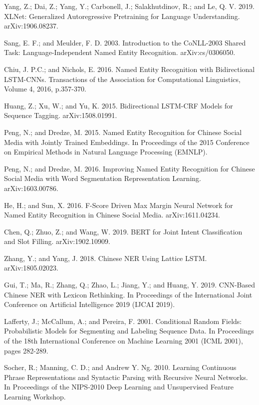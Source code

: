 \documentclass[letterpaper]{article} %
\begin{document}
\smallskip \noindent
Yang, Z.; Dai, Z.; Yang, Y.; Carbonell, J.; Salakhutdinov, R.; and Le, Q. V. 2019. XLNet: Generalized Autoregressive Pretraining for Language Understanding. arXiv:1906.08237.

\smallskip \noindent
Sang, E. F.; and Meulder, F. D. 2003. Introduction to the CoNLL-2003 Shared Task: Language-Independent Named Entity Recognition. arXiv:cs/0306050. 

\smallskip \noindent
Chiu, J. P.C.; and Nichols, E. 2016. Named Entity Recognition with Bidirectional LSTM-CNNs. Transactions of the Association for Computational Linguistics, Volume 4, 2016, p.357-370. 

\smallskip \noindent
Huang, Z.; Xu, W.; and Yu, K. 2015. Bidirectional LSTM-CRF Models for Sequence Tagging. arXiv:1508.01991. 

\smallskip \noindent
Peng, N.; and Dredze, M. 2015. Named Entity Recognition for Chinese Social Media with Jointly Trained Embeddings. In Proceedings of the 2015 Conference on Empirical Methods in Natural Language Processing (EMNLP). 

\smallskip \noindent
Peng, N.; and Dredze, M. 2016. Improving Named Entity Recognition for Chinese Social Media with Word Segmentation Representation Learning. arXiv:1603.00786. 

\smallskip \noindent
He, H.; and Sun, X. 2016. F-Score Driven Max Margin Neural Network for Named Entity Recognition in Chinese Social Media. 	arXiv:1611.04234. 

\smallskip \noindent
Chen, Q.; Zhuo, Z.; and Wang, W. 2019. BERT for Joint Intent Classification and Slot Filling. arXiv:1902.10909. 

\smallskip \noindent
Zhang, Y.; and Yang, J. 2018. Chinese NER Using Lattice LSTM. arXiv:1805.02023. 

\smallskip \noindent
Gui, T.; Ma, R.; Zhang, Q.; Zhao, L.; Jiang, Y.; and Huang, Y. 2019. CNN-Based Chinese NER with Lexicon Rethinking. In Proceedings of the International Joint Conference on Artificial Intelligence 2019 (IJCAI 2019). 

\smallskip \noindent
Lafferty, J.; McCallum, A.; and Pereira, F. 2001. Conditional Random Fields: Probabilistic Models for Segmenting and Labeling Sequence Data. In Proceedings of the 18th International Conference on Machine Learning 2001 (ICML 2001), pages 282-289.

\smallskip \noindent
Socher, R.; Manning, C. D.; and Andrew Y. Ng. 2010. Learning Continuous Phrase Representations and Syntactic Parsing with Recursive Neural Networks. In Proceedings of the NIPS-2010 Deep Learning and Unsupervised Feature Learning Workshop. 
\end{document}

